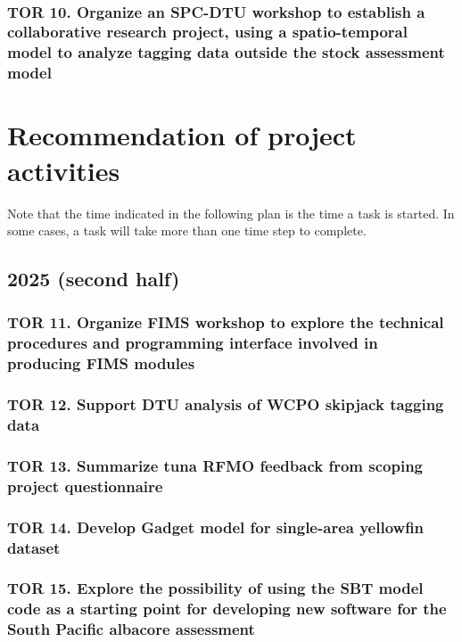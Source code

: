 \documentclass{SCreport}
\begin{document}
~

\subsubsection{TOR 10. Organize an SPC-DTU workshop to establish a collaborative
  research project, using a spatio-temporal model to analyze tagging data
  outside the stock assessment model}

\section{Recommendation of project activities}

Note that the time indicated in the following plan is the time a task is
started. In some cases, a task will take more than one time step to complete.

\subsection{2025 (second half)}

\subsubsection{TOR 11. Organize FIMS workshop to explore the technical
  procedures and programming interface involved in producing FIMS modules}

\subsubsection{TOR 12. Support DTU analysis of WCPO skipjack tagging data}

\subsubsection{TOR 13. Summarize tuna RFMO feedback from scoping project
  questionnaire}

\subsubsection{TOR 14. Develop Gadget model for single-area yellowfin dataset}

\subsubsection{TOR 15. Explore the possibility of using the SBT model code as a
  starting point for developing new software for the South Pacific albacore
  assessment}
\end{document}
